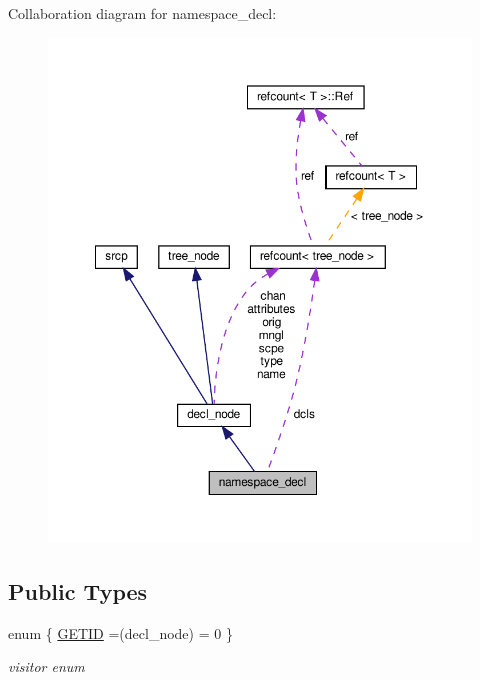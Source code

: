 Collaboration diagram for namespace\+\_\+decl\+:
\nopagebreak
\begin{figure}[H]
\begin{center}
\leavevmode
\includegraphics[width=350pt]{d7/d9e/structnamespace__decl__coll__graph}
\end{center}
\end{figure}
\subsection*{Public Types}
\begin{DoxyCompactItemize}
\item 
enum \{ \hyperlink{structnamespace__decl_a6223f4fe9ccf39dcbee7766409afaab9a1aa659db592d7d6da38ac30d21a5c133}{G\+E\+T\+ID} =(decl\+\_\+node) = 0
 \}\begin{DoxyCompactList}\small\item\em visitor enum \end{DoxyCompactList}
\end{DoxyCompactItemize}
